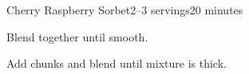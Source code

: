 \documentclass[../Cookbook.tex]{subfiles}
\begin{document}
\begin{recipe}{Cherry Raspberry Sorbet}{2--3 servings}{20 minutes}

Blend together until smooth.

Add chunks and blend until mixture is thick.

\end{recipe}
\end{document}
